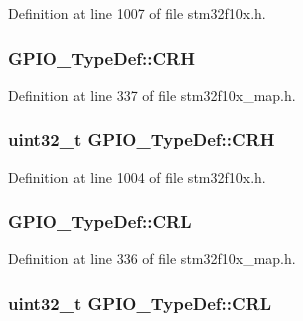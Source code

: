 Definition at line 1007 of file stm32f10x.\+h.

\subsubsection[{\texorpdfstring{C\+RH}{CRH}}]{ G\+P\+I\+O\+\_\+\+Type\+Def\+::\+C\+RH}\hypertarget{struct_g_p_i_o___type_def_abad9580ac00c89acadd6d5145436d124}{}\label{struct_g_p_i_o___type_def_abad9580ac00c89acadd6d5145436d124}


Definition at line 337 of file stm32f10x\+\_\+map.\+h.

\subsubsection[{\texorpdfstring{C\+RH}{CRH}}]{ {\bf uint32\+\_\+t} G\+P\+I\+O\+\_\+\+Type\+Def\+::\+C\+RH}\hypertarget{struct_g_p_i_o___type_def_afe53502a3dbf9e7dcf9ac83f67ac481d}{}\label{struct_g_p_i_o___type_def_afe53502a3dbf9e7dcf9ac83f67ac481d}


Definition at line 1004 of file stm32f10x.\+h.

\subsubsection[{\texorpdfstring{C\+RL}{CRL}}]{ G\+P\+I\+O\+\_\+\+Type\+Def\+::\+C\+RL}\hypertarget{struct_g_p_i_o___type_def_ac6b2e8ad37742e5b91815bd113e13c53}{}\label{struct_g_p_i_o___type_def_ac6b2e8ad37742e5b91815bd113e13c53}


Definition at line 336 of file stm32f10x\+\_\+map.\+h.

\subsubsection[{\texorpdfstring{C\+RL}{CRL}}]{ {\bf uint32\+\_\+t} G\+P\+I\+O\+\_\+\+Type\+Def\+::\+C\+RL}\hypertarget{struct_g_p_i_o___type_def_a218d21e9ca712cec4ca8f00406b2ec29}{}\label{struct_g_p_i_o___type_def_a218d21e9ca712cec4ca8f00406b2ec29}



